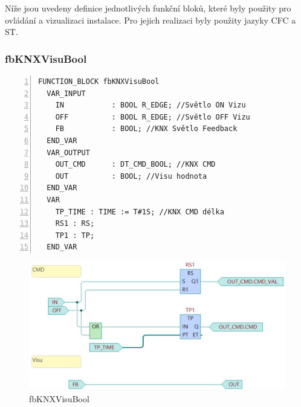 \noindent Níže jsou uvedeny definice jednotlivých funkční bloků, které byly použity pro ovládání a vizualizaci instalace. Pro jejich realizaci byly použity jazyky CFC a ST.

\subsubsection{fbKNXVisuBool}
\begin{lstlisting}[language=ST, breaklines=true, numbers=left, numberstyle=\small, numbersep=10pt, frame=single, basicstyle=\ttfamily\small, caption={Definice funkčního bloku fbKNXVisuBool}, label={lst:fbKNXVisuBool}]
FUNCTION_BLOCK fbKNXVisuBool
  VAR_INPUT
    IN           : BOOL R_EDGE; //Světlo ON Vizu
    OFF          : BOOL R_EDGE; //Světlo OFF Vizu
    FB           : BOOL; //KNX Světlo Feedback
  END_VAR
  VAR_OUTPUT
    OUT_CMD      : DT_CMD_BOOL; //KNX CMD
    OUT          : BOOL; //Visu hodnota
  END_VAR
  VAR
    TP_TIME : TIME := T#1S; //KNX CMD délka
    RS1 : RS;
    TP1 : TP;
  END_VAR

\end{lstlisting}

\begin{figure}[!ht]
    \begin{center}
        \includegraphics[scale=0.5]{obrazky/fbKNXVisuBool.png}
    \end{center}
    \caption[fbKNXVisuBool]{fbKNXVisuBool}
    \label{fig:fbKNXVisuBool}
\end{figure}
\newpage
